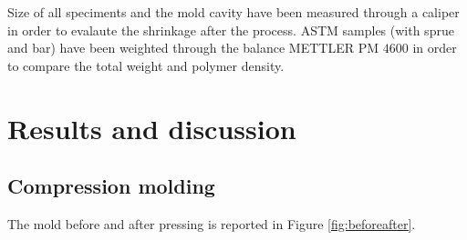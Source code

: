 \documentclass[a4paper, 11pt]{article}
\begin{document}
Size of all speciments and the mold cavity have been measured through a caliper in order to evalaute the shrinkage after the process.
ASTM samples (with sprue and bar) have been weighted through the balance METTLER PM ${4600}$ in order to compare the total weight and polymer density.

\newpage

\section{Results and discussion}

\subsection{Compression molding}

The mold before and after pressing is reported in Figure \ref{fig:beforeafter}. 
\end{document}
